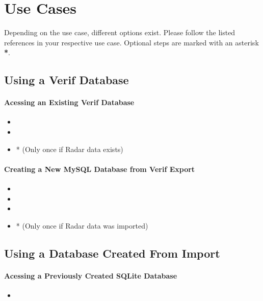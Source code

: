 \section{Use Cases}

Depending on the use case, different options exist. Please follow the listed references in your respective use case. Optional steps are marked with an asterisk \textbf{*}.

\subsection{Using a Verif Database}

\paragraph{Acessing an Existing Verif Database}

\begin{itemize}
 \item {}
 \item {}
 \item {}* (Only once if Radar data exists)
\end{itemize}

\paragraph{Creating a New MySQL Database from Verif Export}

\begin{itemize}
 \item {}
 \item {}
 \item {}
 \item {}* (Only once if Radar data was imported)
\end{itemize}

\subsection{Using a Database Created From Import}

\paragraph{Acessing a Previously Created SQLite Database} 

\begin{itemize}
 \item {}
\end{itemize}

